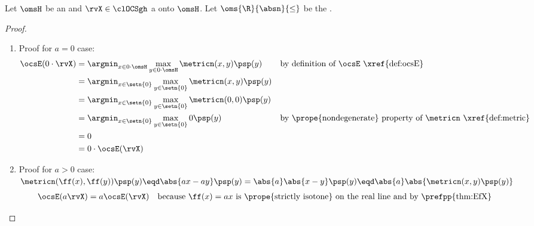 \begin{corollary}
\label{cor:ocsrv_Eax_R}
Let $\omsH$ be an  
and $\rvX\in\clOCSgh$ a   onto $\omsH$.
Let $\oms{\R}{\absn}{\le}$ be the  .
\end{corollary}
\begin{proof}
\begin{enumerate}
  \item Proof for $a=0$ case: 
    \begin{align*}
      \ocsE(0\cdot\rvX)
        &= \argmin_{x\in0\cdot\omsH}\max_{y\in0\cdot\omsH} \metricn(x,y)\psp(y)
        && \text{by definition of $\ocsE$ \xref{def:ocsE}}
      \\&= \argmin_{x\in\setn{0}}\max_{y\in\setn{0}} \metricn(x,y)\psp(y)
      \\&= \argmin_{x\in\setn{0}}\max_{y\in\setn{0}} \metricn(0,0)\psp(y)
      \\&= \argmin_{x\in\setn{0}}\max_{y\in\setn{0}} 0\psp(y)
        && \text{by \prope{nondegenerate} property of $\metricn$ \xref{def:metric}}
      \\&= 0
      \\&= 0\cdot\ocsE(\rvX)
    \end{align*}

  \item Proof for $a>0$ case:
    $\metricn(\ff(x),\ff(y))\psp(y) \eqd \abs{ax-ay}\psp(y) = \abs{a}\abs{x-y}\psp(y) \eqd \abs{a}\abs{\metricn(x,y)\psp(y)}$
    \begin{align*}
      \ocsE(a\rvX)
        &= a\ocsE(\rvX)
        && \text{because $\ff(x)=ax$ is \prope{strictly isotone} on the real line and by \prefpp{thm:EfX}}
    \end{align*}
\end{enumerate}
\end{proof}

